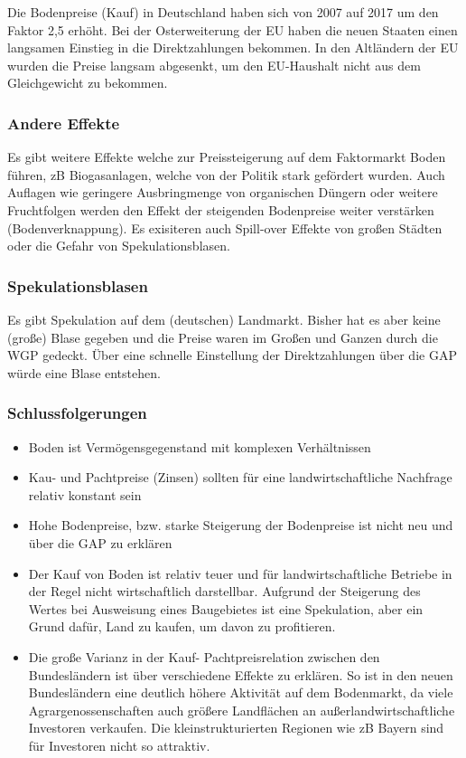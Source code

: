 \documentclass[11pt]{scrartcl}
\begin{document}
Die Bodenpreise (Kauf) in Deutschland haben sich von 2007 auf 2017 um den Faktor 2,5 erhöht.
Bei der Osterweiterung der \ac{EU} haben die neuen Staaten einen langsamen Einstieg in die Direktzahlungen bekommen.
In den Altländern der \ac{EU} wurden die Preise langsam abgesenkt, um den \ac{EU}-Haushalt nicht aus dem Gleichgewicht zu bekommen.

\subsubsection{Andere Effekte} 
Es gibt weitere Effekte welche zur Preissteigerung auf dem Faktormarkt Boden führen, zB Biogasanlagen, welche von der Politik stark gefördert wurden.
Auch Auflagen wie geringere Ausbringmenge von organischen Düngern oder weitere Fruchtfolgen werden den Effekt der steigenden Bodenpreise weiter verstärken (Bodenverknappung).
Es exisiteren auch Spill-over Effekte von großen Städten oder die Gefahr von Spekulationsblasen.

\subsubsection{Spekulationsblasen}
Es gibt Spekulation auf dem (deutschen) Landmarkt.
Bisher hat es aber keine (große) Blase gegeben und die Preise waren im Großen und Ganzen durch die \ac{WGP} gedeckt.
Über eine schnelle Einstellung der Direktzahlungen über die \ac{GAP} würde eine Blase entstehen.

\subsubsection{Schlussfolgerungen}

\begin{itemize}
	\item Boden ist Vermögensgegenstand mit komplexen Verhältnissen
	\item Kau- und Pachtpreise (Zinsen) sollten für eine landwirtschaftliche Nachfrage relativ konstant sein
	\item Hohe Bodenpreise, bzw. starke Steigerung der Bodenpreise ist nicht neu und über die \ac{GAP} zu erklären
	\item Der Kauf von Boden ist relativ teuer und für landwirtschaftliche Betriebe in der Regel nicht wirtschaftlich darstellbar.
		Aufgrund der Steigerung des Wertes bei Ausweisung eines Baugebietes ist eine Spekulation, aber ein Grund dafür, Land zu kaufen, um davon zu profitieren.
	\item Die große Varianz in der Kauf- Pachtpreisrelation zwischen den Bundesländern ist über verschiedene Effekte zu erklären.
		So ist in den neuen Bundesländern eine deutlich höhere Aktivität auf dem Bodenmarkt, da viele Agrargenossenschaften auch größere Landflächen an außerlandwirtschaftliche Investoren verkaufen.
		Die kleinstrukturierten Regionen wie zB Bayern sind für Investoren nicht so attraktiv.
\end{itemize}
\end{document}
